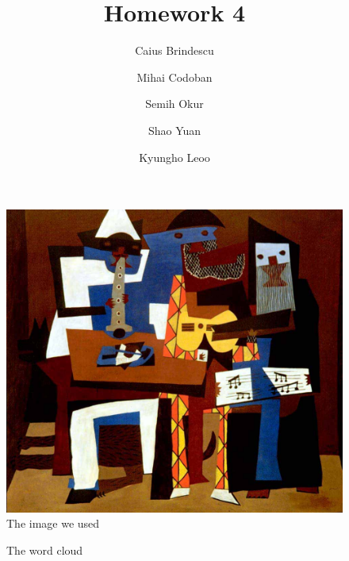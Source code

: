\documentclass{article}
\title{Homework 4}
\author{Caius Brindescu \and Mihai Codoban \and Semih Okur \and Shao Yuan \and Kyungho Leoo}
\begin{document}
\maketitle

\begin{figure}
	\begin{center}
		\includegraphics{image.jpg}
	\end{center}
	\caption{The image we used}
	\label{fig:image}
\end{figure}

\begin{figure}
	\caption{The word cloud}
	\label{fig:cloud}
\end{figure}
\end{document}
